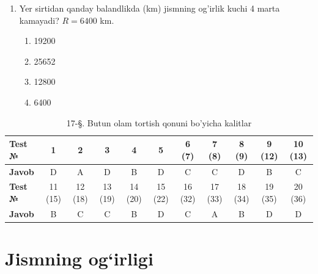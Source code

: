 \begin{enumerate}
\item Yer sirtidan qanday balandlikda (km) jismning og'irlik kuchi 4 marta kamayadi? $R = 6400$ km.
\begin{enumerate}[label=\Alph*)]
\item 19200
\item 25652
\item 12800
\item 6400
\end{enumerate}

\end{enumerate}


\begin{table}[h!]
\centering
\caption{17-\S. Butun olam tortish qonuni bo'yicha kalitlar}
\begin{tabular}{|l|c|c|c|c|c|c|c|c|c|c|}
\hline
\textbf{Test №} & 1 & 2 & 3 & 4 & 5 & 6 (7) & 7 (8) & 8 (9) & 9 (12) & 10 (13) \\ \hline
\textbf{Javob}  & D & A & D & B & D & C & C & D & B & C \\ \hline
\hline
\textbf{Test №} & 11 (15) & 12 (18) & 13 (19) & 14 (20) & 15 (22) & 16 (32) & 17 (33) & 18 (34) & 19 (35) & 20 (36) \\ \hline
\textbf{Javob}  & B & C & C & B & D & C & A & B & D & D \\ \hline
\end{tabular}
\end{table}










\section{Jismning og`irligi}



